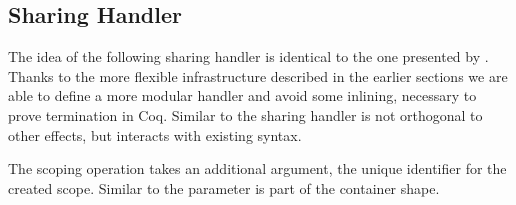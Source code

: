 \subsection{Sharing Handler}

The idea of the following sharing handler is identical to the one presented by
\textcite{bunkenburg2019modeling}.
Thanks to the more flexible infrastructure described in the earlier sections we
are able to define a more modular handler and avoid some inlining, necessary to
prove termination in Coq.
Similar to  the sharing handler is not orthogonal to other
effects, but interacts with existing  syntax.

The scoping operation  takes an additional argument, the
unique identifier for the created scope.
Similar to  the parameter is part of the container shape.

